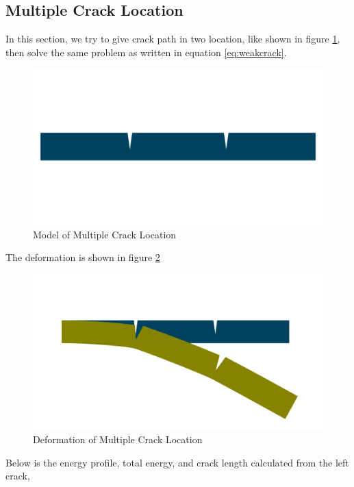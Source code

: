 \documentclass[a4paper,11pt]{article}
\begin{document}
\newpage
\subsection{Multiple Crack Location}
In this section, we try to give crack path in two location, like shown in figure \ref{fig:multicrack-model}, then solve the same problem as written in equation \ref{eq:weakcrack}.
\begin{figure}[h!]
	\centering
	\includegraphics[width=0.7\linewidth]{picture/conference/multicrack-model}
	\caption{Model of Multiple Crack Location}
	\label{fig:multicrack-model}
\end{figure}
The deformation is shown in figure \ref{fig:multicrack-deform}
\begin{figure}
	\centering
	\includegraphics[width=0.7\linewidth]{picture/conference/multicrack-deform}
	\caption{Deformation of Multiple Crack Location}
	\label{fig:multicrack-deform}
\end{figure}
Below is the energy profile, total energy, and crack length calculated from the left crack,
\end{document}
